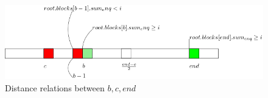 \documentclass[10pt]{article}
\newcommand{\sub}[1]{\textsubscript{#1}}
\renewcommand{\tt}[1]{\texttt{#1}}
\newcommand{\nf}[1]{{\normalfont{\texttt{#1}}}}
\newtheorem{lemma}[theorem]{Lemma}
\theoremstyle{definition}
\newtheorem{definition}[theorem]{Definition}
\begin{document}
\begin{figure}[hbt]  
  \center\includegraphics[width=6in]{pics/doubling.png}
  \caption{Distance relations between $b,c,end$}
  \label{fig::doubling}
\end{figure}

%

\pagebreak

%
%
%
%
%
\end{document}
